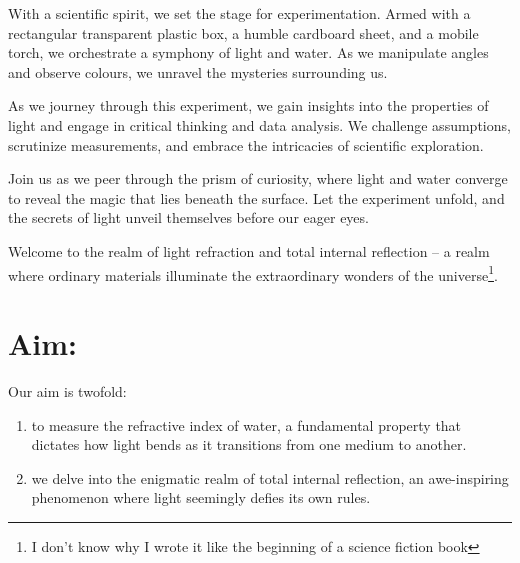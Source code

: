 \documentclass[twocolumn,11pt]{article}
\begin{document}
With a scientific spirit, we set the stage for experimentation. Armed with a rectangular transparent plastic box, a humble cardboard sheet, and a mobile torch, we orchestrate a symphony of light and water. As we manipulate angles and observe colours, we unravel the mysteries surrounding us.

As we journey through this experiment, we gain insights into the properties of light and engage in critical thinking and data analysis. We challenge assumptions, scrutinize measurements, and embrace the intricacies of scientific exploration.

Join us as we peer through the prism of curiosity, where light and water converge to reveal the magic that lies beneath the surface. Let the experiment unfold, and the secrets of light unveil themselves before our eager eyes.

Welcome to the realm of light refraction and total internal reflection – a realm where ordinary materials illuminate the extraordinary wonders of the universe\footnote{I don't know why I wrote it like the beginning of a science fiction book}.
\section{Aim:}
Our aim is twofold: 
\begin{enumerate}
    \item to measure the refractive index of water, a fundamental property that dictates how light bends as it transitions from one medium to another.
    \item we delve into the enigmatic realm of total internal reflection, an awe-inspiring phenomenon where light seemingly defies its own rules.
\end{enumerate} 
\end{document}
